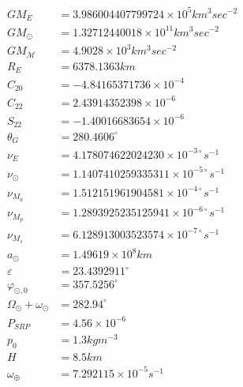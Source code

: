 \documentclass{article}
\begin{document}
\begin{align}
GM_E &=3.986004407799724\times 10^5 km^3 sec^{-2} \\
GM_\odot &= 1.32712440018\times 10^{11}km^3 sec^{-2} \\
GM_{\mathcal M} &=4.9028\times 10^{3}km^3 sec^{-2} \\
R_E &=6378.1363 km\\
C_{20} &= -4.84165371736\times 10^{-4}\\
C_{22} &= 2.43914352398\times 10^{-6}\\
S_{22} &=-1.40016683654\times 10^{-6}\\
\theta_G &= 280.4606^\circ\\
\nu_E &= 4.178074622024230\times 10^{-3\circ} s^{-1}\\
\nu_\odot &= 1.1407410259335311\times 10^{-5\circ} s^{-1}\\
\nu_{M_a} &= 1.512151961904581\times 10^{-4\circ} s^{-1}\\
\nu_{M_p} &= 1.2893925235125941\times 10^{-6\circ} s^{-1}\\
\nu_{M_s} &= 6.128913003523574\times 10^{-7\circ} s^{-1}\\
a_\odot &= 1.49619 \times 10^8 km\\
\varepsilon &= 23.4392911^\circ\\
\varphi_{\odot,0} &= 357.5256^\circ\\
\Omega_\odot + \omega_\odot &= 282.94^\circ \\
P_{SRP} &= 4.56\times 10^{-6} \\
p_0 &= 1.3 kg m^{-3} \\
H &= 8.5 km \\
\omega_{\oplus} &= 7.292115 \times 10^{-5} s^{-1}
\end{align}
\end{document}
